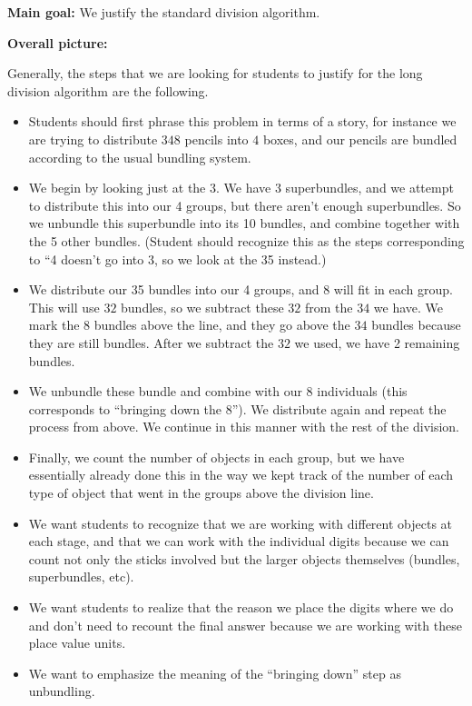 \documentclass[nooutcomes,noauthor, handout]{ximera}
\begin{document}
\begin{instructorNotes} 



{\bf Main goal:} We justify the standard division algorithm.


{\bf Overall picture:} 


Generally, the steps that we are looking for students to justify for the long division algorithm are the following.
\begin{itemize}
	\item Students should first phrase this problem in terms of a story, for instance we are trying to distribute $348$ pencils into $4$ boxes, and our pencils are bundled according to the usual bundling system.
	\item We begin by looking just at the $3$. We have 3 superbundles, and we attempt to distribute this into our 4 groups, but there aren't enough superbundles. So we unbundle this superbundle into its 10 bundles, and combine together with the 5 other bundles. (Student should recognize this as the steps corresponding to ``4 doesn't go into 3, so we look at the 35 instead.)
	\item We distribute our 35 bundles into our 4 groups, and $8$ will fit in each group. This will use $32$ bundles, so we subtract these $32$ from the $34$ we have. We mark the $8$ bundles above the line, and they go above the $34$ bundles because they are still bundles. After we subtract the $32$ we used, we have 2 remaining bundles.
	\item We unbundle these bundle and combine  with our 8 individuals (this corresponds to ``bringing down the $8$''). We distribute again and repeat the process from above. We continue in this manner with the rest of the division.
	\item Finally, we count the number of objects in each group, but we have essentially already done this in the way we kept track of the number of each type of object that went in the groups above the division line.
	\item We want students to recognize that we are working with different objects at each stage, and that we can work with the individual digits because we can count not only the sticks involved but the larger objects themselves (bundles, superbundles, etc).
	\item We want students to realize that the reason we place the digits where we do and don't need to recount the final answer because we are working with these place value units.
	\item We want to emphasize the meaning of the ``bringing down'' step as unbundling.

\end{itemize}
\end{instructorNotes}
\end{document}
